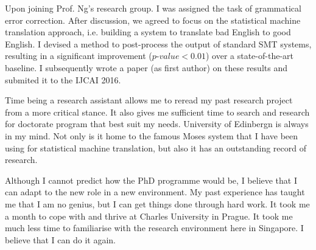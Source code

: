 \documentclass[a4paper, 11pt]{scrartcl}
\begin{document}
Upon joining Prof. Ng's research group. I was assigned the task of grammatical error correction.
After discussion, we agreed to focus on the statistical machine translation approach, i.e. building a system to translate bad English to good English. 
I devised a method to post-process the output of standard SMT systems, resulting in a significant improvement ($p\mbox{-}value < 0.01$) over a state-of-the-art baseline. 
I subsequently wrote a paper (as first author) on these results and submited it to the IJCAI 2016.  

Time being a research assistant allows me to reread my past research project from a more critical stance. It also gives me sufficient time to search and research for doctorate program that best suit my needs.
University of Edinbergn is always in my mind. Not only is it home to the famous Moses system that I have been using for statistical machine translation, but also it has an outstanding record of research.

Although I cannot predict how the PhD programme would be, I believe that I can adapt to the new role in a new environment. 
My past experience has taught me that I am no genius, but I can get things done through hard work.
It took me a month to cope with and thrive at Charles University in Prague.
It took me much less time to familiarise with the research environment here in Singapore.
I believe that I can do it again. 
\end{document}
